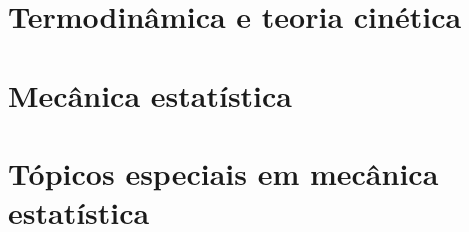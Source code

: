 \documentclass[eps,11pt]{book}
\begin{document}
\renewcommand{\partname}{Parte}
\renewcommand{\contentsname}{Índice}
\tableofcontents
\renewcommand{\chaptername}{Capítulo}
\part{Termodinâmica e teoria cinética}


\part{Mecânica estatística}



\part{Tópicos especiais em mecânica estatística}





\end{document}
